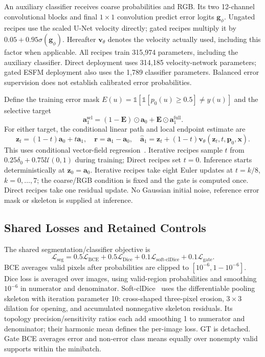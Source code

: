 \documentclass[jimaging,article,submit,pdftex,moreauthors]{Definitions/mdpi}
\begin{document}
An auxiliary classifier receives coarse probabilities and RGB. Its two
12-channel convolutional blocks and final $1\times1$ convolution predict error
logits $\mathbf{g}_{\phi}$. Ungated recipes use the scaled U-Net velocity
directly; gated recipes multiply it by
$0.05+0.95\sigma(\mathbf{g}_{\phi})$. Hereafter $\mathbf{v}_{\theta}$ denotes
the velocity actually used, including this factor when applicable. All
recipes train 315,974 parameters, including the auxiliary classifier. Direct
deployment uses 314,185 velocity-network parameters; gated ESFM deployment
also uses the 1,789 classifier parameters. Balanced error supervision does
not establish calibrated error probabilities.

Define the training error mask
$E(u)=\mathbb{1}[\mathbb{1}[p_0(u)\geq0.5]\ne y(u)]$ and the selective target
\begin{equation}
\mathbf{a}_1^{\mathrm{sel}}
=(1-\mathbf{E})\odot\mathbf{a}_0
 +\mathbf{E}\odot\mathbf{a}_1^{\mathrm{full}}.
\end{equation}
For either target, the conditional linear path and local endpoint estimate are
\begin{equation}
\mathbf{z}_t=(1-t)\mathbf{a}_0+t\mathbf{a}_1,\quad
\mathbf{r}=\mathbf{a}_1-\mathbf{a}_0,\quad
\widehat{\mathbf{a}}_1=\mathbf{z}_t+(1-t)
\mathbf{v}_{\theta}(\mathbf{z}_t,t,\mathbf{p}_0,\mathbf{x}).
\label{eq:linear-path}
\end{equation}
This uses conditional vector-field regression~\cite{Lipman2023}. Iterative
recipes sample $t$ from $0.25\delta_0+0.75\mathcal{U}(0,1)$ during training;
Direct recipes set $t=0$. Inference starts deterministically at
$\mathbf{z}_0=\mathbf{a}_0$. Iterative recipes take eight Euler updates at
$t=k/8$, $k=0,\ldots,7$; the coarse/RGB condition is fixed and the gate is
computed once. Direct recipes take one residual update. No Gaussian initial
noise, reference error mask or skeleton is supplied at inference.

\subsection{Shared Losses and Retained Controls}
The shared segmentation/classifier objective is
\begin{equation}
\mathcal{L}_{\mathrm{seg}}
=0.5\mathcal{L}_{\mathrm{BCE}}+0.5\mathcal{L}_{\mathrm{Dice}}
 +0.1\mathcal{L}_{\mathrm{soft\mbox{-}clDice}}
 +0.1\mathcal{L}_{\mathrm{gate}}.
\label{eq:shared-loss}
\end{equation}
BCE averages valid pixels after probabilities are clipped to
$[10^{-6},1-10^{-6}]$. Dice loss is averaged over images, using valid-region
probabilities and smoothing $10^{-6}$ in numerator and denominator.
Soft-clDice~\cite{Shit2021} uses the differentiable pooling skeleton with
iteration parameter 10: cross-shaped three-pixel erosion, $3\times3$ dilation
for opening, and accumulated nonnegative skeleton residuals. Its topology
precision/sensitivity ratios each add smoothing 1 to numerator and
denominator; their harmonic mean defines the per-image loss. GT is detached.
Gate BCE averages error and non-error class means equally over nonempty
valid supports within the minibatch.
\end{document}
